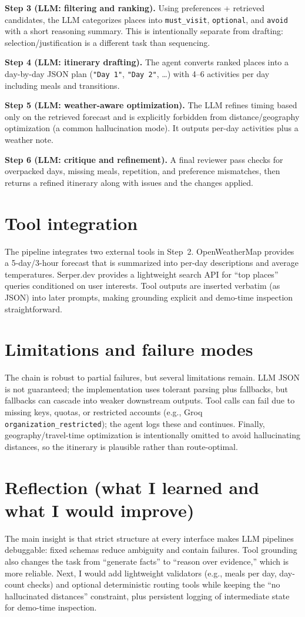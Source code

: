 \documentclass[10pt]{article}
\begin{document}
\textbf{Step 3 (LLM: filtering and ranking).} Using preferences + retrieved candidates, the LLM categorizes places into \texttt{must\_visit}, \texttt{optional}, and \texttt{avoid} with a short reasoning summary. This is intentionally separate from drafting: selection/justification is a different task than sequencing.

\textbf{Step 4 (LLM: itinerary drafting).} The agent converts ranked places into a day-by-day JSON plan (\texttt{"Day 1"}, \texttt{"Day 2"}, \ldots) with 4--6 activities per day including meals and transitions.

\textbf{Step 5 (LLM: weather-aware optimization).} The LLM refines timing based only on the retrieved forecast and is explicitly forbidden from distance/geography optimization (a common hallucination mode). It outputs per-day activities plus a weather note.

\textbf{Step 6 (LLM: critique and refinement).} A final reviewer pass checks for overpacked days, missing meals, repetition, and preference mismatches, then returns a refined itinerary along with issues and the changes applied.

\section{Tool integration}
The pipeline integrates two external tools in Step~2. OpenWeatherMap provides a 5-day/3-hour forecast that is summarized into per-day descriptions and average temperatures. Serper.dev provides a lightweight search API for ``top places'' queries conditioned on user interests. Tool outputs are inserted verbatim (as JSON) into later prompts, making grounding explicit and demo-time inspection straightforward.

\section{Limitations and failure modes}
The chain is robust to partial failures, but several limitations remain. LLM JSON is not guaranteed; the implementation uses tolerant parsing plus fallbacks, but fallbacks can cascade into weaker downstream outputs. Tool calls can fail due to missing keys, quotas, or restricted accounts (e.g., Groq \texttt{organization\_restricted}); the agent logs these and continues. Finally, geography/travel-time optimization is intentionally omitted to avoid hallucinating distances, so the itinerary is plausible rather than route-optimal.

\section{Reflection (what I learned and what I would improve)}
The main insight is that strict structure at every interface makes LLM pipelines debuggable: fixed schemas reduce ambiguity and contain failures. Tool grounding also changes the task from ``generate facts'' to ``reason over evidence,'' which is more reliable. Next, I would add lightweight validators (e.g., meals per day, day-count checks) and optional deterministic routing tools while keeping the ``no hallucinated distances'' constraint, plus persistent logging of intermediate state for demo-time inspection.
\end{document}
